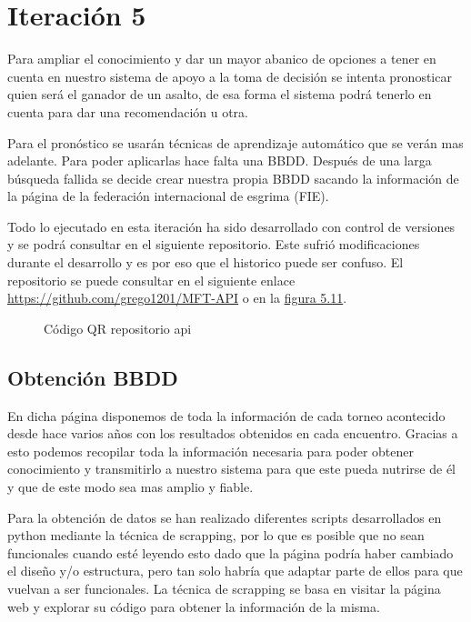 \section{Iteración 5}


Para ampliar el conocimiento y dar un mayor abanico de opciones
a tener en cuenta en nuestro sistema de apoyo a la toma de decisión
se intenta pronosticar quien será el ganador de un asalto, de esa forma
el sistema podrá tenerlo en cuenta para dar una recomendación u otra.


Para el pronóstico se usarán técnicas de aprendizaje automático que se
verán mas adelante. Para poder aplicarlas hace falta una BBDD. Después de
una larga búsqueda fallida se decide crear nuestra propia BBDD sacando
la información de la página de la federación internacional de esgrima (FIE).

Todo lo ejecutado en esta iteración ha sido desarrollado con control de versiones
y se podrá consultar en el siguiente repositorio. Este sufrió modificaciones durante
el desarrollo y es por eso que el historico puede ser confuso. El repositorio se puede
consultar en el siguiente enlace \url{https://github.com/grego1201/MFT-API} o en la \hyperref[fig:Código QR repositorio api]{figura 5.11}.

\begin{figure}[htb]
  \centering
  \caption[Código QR repositorio api]{Código QR repositorio api}
  \label{fig:Código QR repositorio api}
\end{figure}

\subsection{Obtención BBDD}

En dicha página disponemos de toda la información de cada torneo acontecido
desde hace varios años con los resultados obtenidos en cada encuentro. Gracias
a esto podemos recopilar toda la información necesaria para poder obtener conocimiento
y transmitirlo a nuestro sistema para que este pueda nutrirse de él y que de este
modo sea mas amplio y fiable.

Para la obtención de datos se han realizado diferentes scripts desarrollados en
python mediante la técnica de scrapping, por lo que es posible que no sean funcionales
cuando esté leyendo esto dado que la página podría haber cambiado el diseño y/o
estructura, pero tan solo habría que adaptar parte de ellos para que vuelvan a
ser funcionales. La técnica de scrapping se basa en visitar la página web y
explorar su código para obtener la información de la misma.


